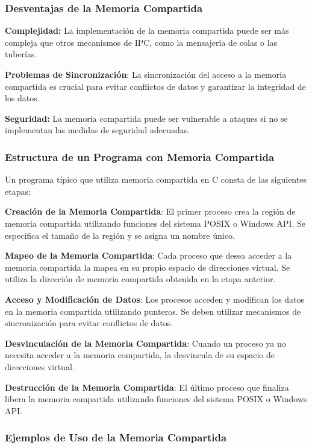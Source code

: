 \subsubsection{Desventajas de la Memoria Compartida}\label{desventajas-de-la-memoria-compartida}

\textbf{Complejidad:} La implementación de la memoria compartida puede ser más compleja que otros mecanismos de IPC, como la mensajería de colas o las tuberías.

\textbf{Problemas de Sincronización}: La sincronización del acceso a la memoria compartida es crucial para evitar conflictos de datos y garantizar la integridad de los datos.

\textbf{Seguridad:} La memoria compartida puede ser vulnerable a ataques si no se implementan las medidas de seguridad adecuadas.

\subsubsection{Estructura de un Programa con Memoria Compartida}\label{estructura-de-un-programa-con-memoria-compartida}

Un programa típico que utiliza memoria compartida en C consta de las siguientes etapas:

\textbf{Creación de la Memoria Compartida}: El primer proceso crea la región de memoria compartida utilizando funciones del sistema POSIX o Windows API. Se especifica el tamaño de la región y se asigna un nombre único.

\textbf{Mapeo de la Memoria Compartida}: Cada proceso que desea acceder a la memoria compartida la mapea en su propio espacio de direcciones virtual. Se utiliza la dirección de memoria compartida obtenida en la etapa anterior.

\textbf{Acceso y Modificación de Datos}: Los procesos acceden y modifican los datos en la memoria compartida utilizando punteros. Se deben utilizar mecanismos de sincronización para evitar conflictos de datos.

\textbf{Desvinculación de la Memoria Compartida}: Cuando un proceso ya no necesita acceder a la memoria compartida, la desvincula de su espacio de direcciones virtual.

\textbf{Destrucción de la Memoria Compartida}: El último proceso que finaliza libera la memoria compartida utilizando funciones del sistema POSIX o Windows API.

\subsubsection{Ejemplos de Uso de la Memoria Compartida}\label{ejemplos-de-uso-de-la-memoria-compartida}

